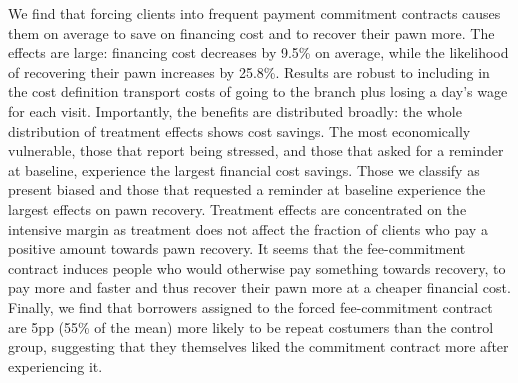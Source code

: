 \documentclass[11pt]{article}
\begin{document}
We find that forcing clients into frequent payment commitment contracts causes them on average to save on financing cost and to recover their pawn more. The effects are large: financing cost decreases by 9.5\% on average, while the likelihood of recovering their pawn increases by 25.8\%. Results are robust to including in the cost definition transport costs of going to the branch plus losing a day's wage for each visit. Importantly, the benefits are distributed broadly: the whole distribution of treatment effects shows cost savings. The most economically vulnerable, those that report being stressed, and those that asked for a reminder at baseline, experience the largest financial cost savings. Those we classify as present biased and those that requested a reminder at baseline experience the largest effects on pawn recovery. %
Treatment effects are concentrated on the intensive margin as treatment does not affect the fraction of clients who pay a positive amount towards pawn recovery. It seems that the fee-commitment contract induces people who would otherwise pay something towards recovery, to pay more and faster and thus recover their pawn more at a cheaper financial cost. Finally, we find that borrowers assigned to the forced fee-commitment contract are 5pp (55\% of the mean) more likely to be repeat costumers than the control group, suggesting that they themselves liked the commitment contract more after experiencing it.

\end{document}
